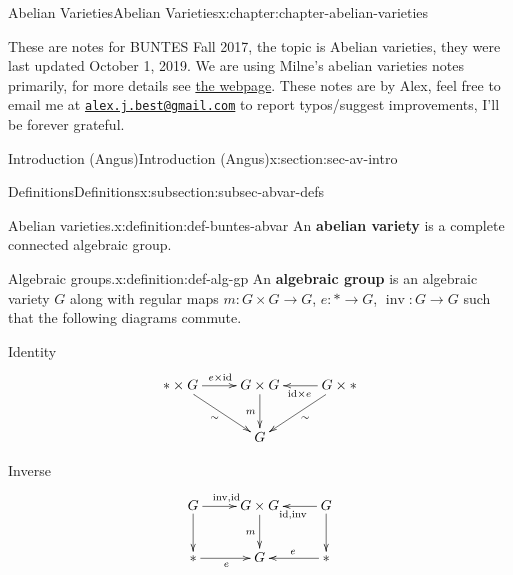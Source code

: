 \documentclass[oneside,10pt,]{book}
\newcommand{\terminology}[1]{\textbf{#1}}
\numberwithin{equation}{section}
\newcommand{\id}{\mathrm{id}}
\begin{document}
\begin{chapterptx}{Abelian Varieties}{}{Abelian Varieties}{}{}{x:chapter:chapter-abelian-varieties}
\begin{introduction}{}%
These are notes for BUNTES Fall 2017, the topic is Abelian varieties, they were last updated October 1, 2019. We are using Milne's abelian varieties notes primarily, for more details see \href{http://math.bu.edu/people/angusmca/buntes/fall2017.html}{the webpage}. These notes are by Alex, feel free to email me at \href{mailto:alex.j.best@gmail.com}{\nolinkurl{alex.j.best@gmail.com}} to report typos\slash{}suggest improvements, I'll be forever grateful.%
\end{introduction}%
%
%
\typeout{************************************************}
\typeout{************************************************}
%
\begin{sectionptx}{Introduction (Angus)}{}{Introduction (Angus)}{}{}{x:section:sec-av-intro}
%
%
\typeout{************************************************}
\typeout{************************************************}
%
\begin{subsectionptx}{Definitions}{}{Definitions}{}{}{x:subsection:subsec-abvar-defs}
\begin{definition}{Abelian varieties.}{x:definition:def-buntes-abvar}%
An \terminology{abelian variety} is a complete connected algebraic group.%
\end{definition}
\begin{definition}{Algebraic groups.}{x:definition:def-alg-gp}%
An \terminology{algebraic group} is an algebraic variety \(G\) along with regular maps \(m\colon G\times G\to G\), \(e \colon * \to G\),  \(\operatorname{inv}\colon G\to G\) such that the following diagrams commute.%
\par
Identity%
\begin{equation*}
\xymatrix{
\ast\times G\ar[dr]_{\sim}\ar[r]^{e\times \id} & G\times G\ar[d]_m &G\times \ast\ar[l]^{\id\times e}\ar[dl]^\sim\\
& G &
}
\end{equation*}
%
\par
Inverse%
\begin{equation*}
\xymatrix{
G\ar[d]\ar[r]^{\operatorname{inv}, \id} & G\times G\ar[d]_m &G\ar[l]^{\id, \operatorname{inv}}\ar[d]\\
\ast\ar[r]_e& G &\ast\ar[l]_e
}
\end{equation*}
%
\par

\end{definition}
\end{subsectionptx}
\end{sectionptx}
\end{chapterptx}
\end{document}
